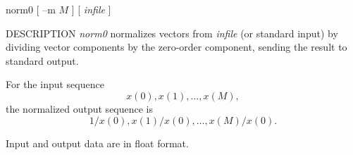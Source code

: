 % 
% 
% 
% 
%                                                                        
%
\hypertarget{norm0}{}

\begin{synopsis}
\item[norm0] [ --m $M$ ] [ {\em infile} ]
\end{synopsis}

\begin{qsection}{DESCRIPTION}
{\em norm0} normalizes vectors from {\em infile} (or standard input) 
by dividing vector components by the zero-order component, 
sending the result to standard output.

For the input sequence
\begin{displaymath}
x(0), x(1), \dots, x(M), 
\end{displaymath}
the normalized output sequence is
\begin{displaymath}
1/x(0), x(1)/x(0), \dots, x(M)/x(0). 
\end{displaymath}

Input and output data are in float format.
\end{qsection}

